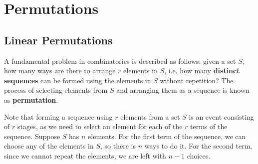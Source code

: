 \documentclass[math]{amznotes}
\theoremstyle{remark}
\begin{document}
\section{Permutations}
\subsection{Linear Permutations}
A fundamental problem in combinatorics is described as follows: given a set $S$, how many ways are there to arrange $r$ elements in $S$, i.e. how many \textbf{distinct sequences} can be formed using the elements in $S$ without repetition? The process of selecting elements from $S$ and arranging them as a sequence is known as \textbf{permutation}.

Note that forming a sequence using $r$ elements from a set $S$ is an event consisting of $r$ stages, as we need to select an element for each of the $r$ terms of the sequence. Suppose $S$ has $n$ elements. For the first term of the sequence, we can choose any of the elements in $S$, so there is $n$ ways to do it. For the second term, since we cannot repeat the elements, we are left with $n - 1$ choices. 
\end{document}
